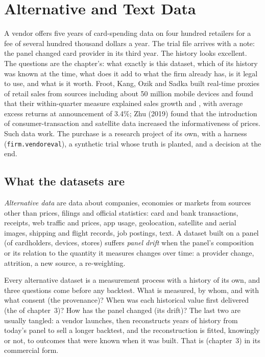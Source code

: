 \chapter{Alternative and Text Data}\label{ch:rs:alternative-and-text-data}

A vendor offers five years of card-spending data on four hundred retailers for a fee of several hundred thousand dollars a
year. The trial file arrives with a note: the panel changed card provider in its third year. The history looks excellent. The
questions are the chapter's: what exactly is this dataset, which of its history was known at the time, what does it add to
what the firm already has, is it legal to use, and what is it worth. Froot, Kang, Ozik and Sadka built real-time proxies of
retail sales from sources including about 50 million mobile devices and found that their within-quarter measure explained
sales growth and , with average excess returns at announcement of 3.4\%; Zhu (2019) found that the
introduction of consumer-transaction and satellite data increased the informativeness of prices. Such data work. The purchase is
a research project of its own, with a harness (\texttt{firm.vendoreval}), a synthetic trial whose truth is planted, and a decision
at the end.

\section{What the datasets are}

\begin{definition}\label{def:rs:alternative-and-text-data:altdata}
\emph{Alternative data} are data about companies, economies or markets from sources other than prices,
filings and official statistics: card and bank transactions, receipts, web traffic and prices, app usage, geolocation, satellite
and aerial images, shipping and flight records, job postings, text. A dataset built on a panel (of cardholders, devices, stores)
suffers \emph{panel drift} when the panel's composition or its relation to the quantity it measures changes over
time: a provider change, attrition, a new source, a re-weighting.
\end{definition}

Every alternative dataset is a measurement process with a history of its own, and three questions come before any backtest. What is
measured, by whom, and with what consent (the provenance)? When was each historical value first delivered (the  of
chapter~3)? How has the panel changed (its drift)? The last two are usually tangled: a vendor launches, then reconstructs years of
history from today's panel to sell a longer backtest, and the reconstruction is fitted, knowingly or not, to outcomes that were known
when it was built. That is  (chapter~3) in its commercial form.

